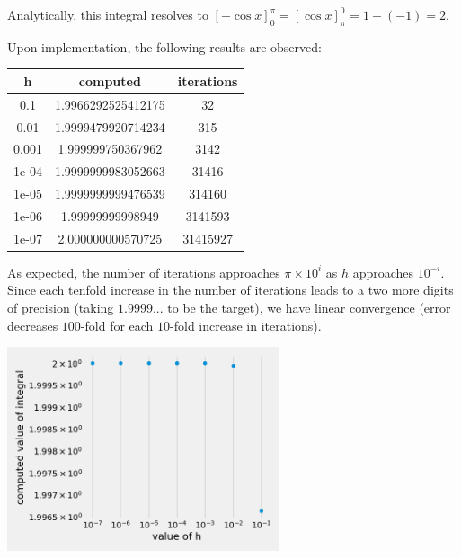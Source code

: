 Analytically, this integral resolves to $[-\cos x]^\pi_0 = [\cos x]^0_\pi = 1 - (-1) = 2$.\bigskip

Upon implementation, the following results are observed:

\begin{center}
    \begin{tabular}{|c|c|c|}
        \hline \textbf{h} & \textbf{computed} & \textbf{iterations}\\
        \hline 0.1 & 1.9966292525412175 & 32\\
        \hline 0.01 & 1.9999479920714234 & 315\\
        \hline 0.001 & 1.999999750367962 & 3142\\
        \hline 1e-04 & 1.9999999983052663 & 31416\\
        \hline 1e-05 & 1.9999999999476539 & 314160\\
        \hline 1e-06 & 1.99999999998949 & 3141593\\
        \hline 1e-07 & 2.000000000570725 & 31415927\\
        \hline 
    \end{tabular}
\end{center}

As expected, the number of iterations approaches $\pi \times 10^i$ as $h$ approaches $10^{-i}$. Since each tenfold increase in the number of iterations leads to a two more digits of precision (taking $1.9999...$ to be the target), we have linear convergence (error decreases $100$-fold for each $10$-fold increase in iterations).

\begin{center}
    \includegraphics*[width=0.6\textwidth]{res/1.1-convergence.png}
\end{center}
